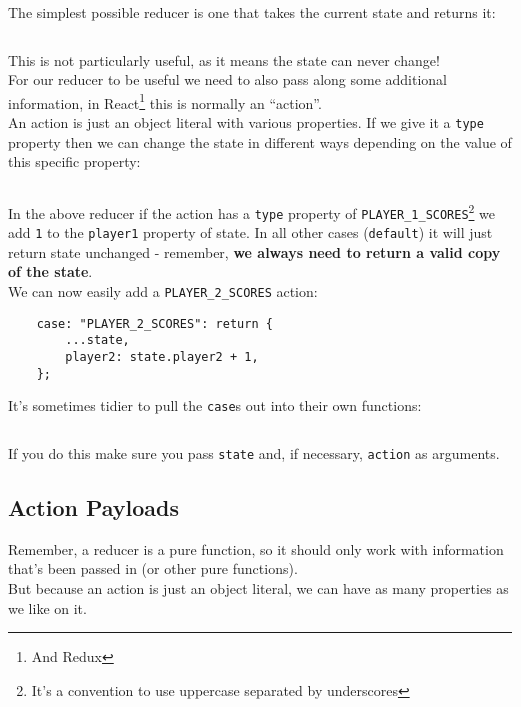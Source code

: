 The simplest possible reducer is one that takes the current state and returns it:

\inputminted{js}{04-hooks/figures/04-reducer-id.js}

This is not particularly useful, as it means the state can never change!
\\

For our reducer to be useful we need to also pass along some additional information, in React\footnote{And Redux} this is normally an ``action''.
\\

An action is just an object literal with various properties. If we give it a \texttt{type} property then we can change the state in different ways depending on the value of this specific property:

\inputminted{js}{04-hooks/figures/05-reducer-p1scores.js}

In the above reducer if the action has a \texttt{type} property of \texttt{PLAYER\_1\_SCORES}\footnote{It's a convention to use uppercase separated by underscores} we add \texttt{1} to the \texttt{player1} property of state. In all other cases (\texttt{default}) it will just return state unchanged - remember, \textbf{we always need to return a valid copy of the state}.
\\

We can now easily add a \texttt{PLAYER\_2\_SCORES} action:

\begin{verbatim}
    case: "PLAYER_2_SCORES": return {
        ...state,
        player2: state.player2 + 1,
    };
\end{verbatim}

It's sometimes tidier to pull the \texttt{case}s out into their own functions:

\inputminted{js}{04-hooks/figures/06-reducer-pull.js}

If you do this make sure you pass \texttt{state} and, if necessary, \texttt{action} as arguments.


\subsection{Action Payloads}

Remember, a reducer is a pure function, so it should only work with information that's been passed in (or other pure functions).
\\

But because an action is just an object literal, we can have as many properties as we like on it.
\\


